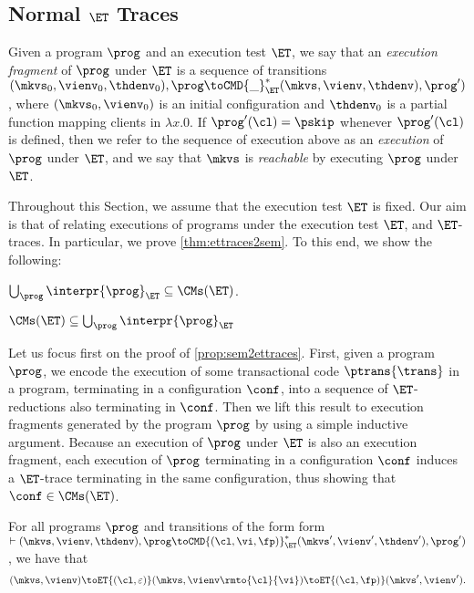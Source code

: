 \subsection{Normal \( \ET \) Traces}
\label{sec:normal-form-exist}
Given a program $\prog$ and an execution test $\ET$, we say that an \emph{execution fragment} of 
$\prog$ under $\ET$ is a sequence of transitions 
$(\mkvs_{0}, \vienv_{0}, \thdenv_{0} ), \prog \toCMD{\_}_{\ET}^{\ast} ( \mkvs, \vienv, \thdenv ) , \prog' )$, 
where $(\mkvs_{0}, \vienv_{0})$ is an initial configuration and $\thdenv_{0}$ is a partial function mapping 
clients in $\lambda x. 0$. If $\prog'(\cl) = \pskip$ whenever $\prog'(\cl)$ is defined, then 
we refer to the sequence of execution above as an \emph{execution} of $\prog$ under $\ET$, and 
we say that $\mkvs$ is \emph{reachable} by executing $\prog$ under $\ET$.

Throughout this Section, we assume that the execution test $\ET$ is fixed. 
Our aim is that of relating  executions of programs under the execution test $\ET$, and $\ET$-traces. 
In particular, we prove  \cref{thm:ettraces2sem}. To this end, we show the following: 

\begin{proposition}
\label{prop:sem2ettraces}
$\bigcup_{\prog} \interpr{\prog}_{\ET} \subseteq \CMs(\ET)$.
\end{proposition}

\begin{proposition}
\label{prop:ettraces2sem}
$\CMs(\ET) \subseteq \bigcup_{\prog} \interpr{\prog}_{\ET}$
\end{proposition}

Let us focus first on the proof of \cref{prop:sem2ettraces}. First, given a program $\prog$, 
we encode the execution of some transactional code $\ptrans{\trans}$ in a program, 
terminating in a configuration $\conf$, into a sequence of $\ET$-reductions also terminating 
in $\conf$. Then we lift this result to execution fragments generated by the program $\prog$ by using 
a simple inductive argument. Because an execution of $\prog$ under $\ET$ is also an execution fragment, 
each execution of $\prog$ terminating in a configuration $\conf$ induces a $\ET$-trace terminating in 
the same configuration, thus showing that $\conf \in \CMs(\ET)$.

\begin{lemma}
\label{lem:sem2ettrace}
For all programs $\prog$ and transitions of the form 
form $\vdash (\mkvs, \vienv, \thdenv ), \prog \toCMD{(\cl, \vi, \fp)}_{\ET}^{\ast} ( \mkvs', \vienv', \thdenv' ) , \prog' )$,  
we have that  
\[
(\mkvs, \vienv) \toET{(\cl, \varepsilon)} (\mkvs, \vienv\rmto{\cl}{\vi}) \toET{(\cl, \fp)} (\mkvs', \vienv').
\]
\end{lemma}


